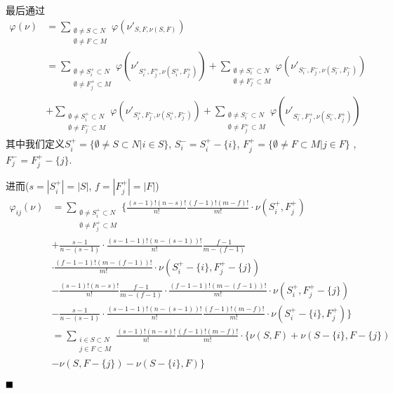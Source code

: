 最后通过
\begin{align*}
	\varphi(\nu) &= \sum_{\substack{\emptyset\neq S\subset N\\\emptyset\neq F\subset M}}\varphi(\nu'_{S,F,\nu(S,F)})\\
	&=\sum_{\substack{\emptyset\neq S_i^+\subset N\\\emptyset\neq F_j^+\subset M}}\varphi(\nu'_{S_i^+,F_j^+,\nu(S_i^+,F_j^+)})
	+\sum_{\substack{\emptyset\neq S_i^-\subset N\\\emptyset\neq F_j^-\subset M}}\varphi(\nu'_{S_i^-,F_j^-,\nu(S_i^-,F_j^-)})\\
	&+\sum_{\substack{\emptyset\neq S_i^+\subset N\\\emptyset\neq F_j^-\subset M}}\varphi(\nu'_{S_i^+,F_j^-,\nu(S_i^+,F_j^-)})
	+\sum_{\substack{\emptyset\neq S_i^-\subset N\\\emptyset\neq F_j^+\subset M}}\varphi(\nu'_{S_i^-,F_j^+,\nu(S_i^-,F_j^+)})
\end{align*}
其中我们定义$S_i^+ = \{\emptyset\neq S\subset N| i\in S\}$, $S_i^- = S_i^+-\{i\}$, $F_j^+ = \{\emptyset\neq F\subset M| j\in F\}$ , $F_j^- = F_j^+-\{j\}$.

进而($s=|S_i^+|=|S|$, $f = |F_j^+|=|F|$)
\begin{equation}
	\begin{aligned}
		\varphi_{ij}(\nu) &= \sum_{\substack{\emptyset\neq S_i^+\subset N\\\emptyset\neq F_j^+\subset M}}
		\{\frac{(s-1)!(n-s)!}{n!}\frac{(f-1)!(m-f)!}{m!}\cdot \nu(S_i^+, F_j^+)\\
		&+\frac{s-1}{n-(s-1)}\cdot\frac{(s-1-1)!(n-(s-1))!}{n!}\frac{f-1}{m-(f-1)}\\
		&\cdot\frac{(f-1-1)!(m-(f-1))!}{m!}
		\cdot\nu(S_i^+-\{i\}, F_j^+-\{j\})\\
		&-\frac{(s-1)!(n-s)!}{n!}\frac{f-1}{m-(f-1)}\cdot\frac{(f-1-1)!(m-(f-1))!}{m!}\cdot\nu(S_i^+, F_j^+-\{j\})\\
		&-\frac{s-1}{n-(s-1)}\cdot\frac{(s-1-1)!(n-(s-1))!}{n!}\frac{(f-1)!(m-f)!}{m!}\cdot \nu(S_i^+-\{i\}, F_j^+)\}\\
		&=\sum_{\substack{i\in S\subset N\\j\in F\subset M}}
		\frac{(s-1)!(n-s)!}{n!}\frac{(f-1)!(m-f)!}{m!}\cdot \{\nu(S, F)+\nu(S-\{i\}, F-\{j\})\\
		&-\nu(S, F-\{j\})-\nu(S-\{i\}, F)\}
	\end{aligned}
\end{equation}

$\hfill\blacksquare$

